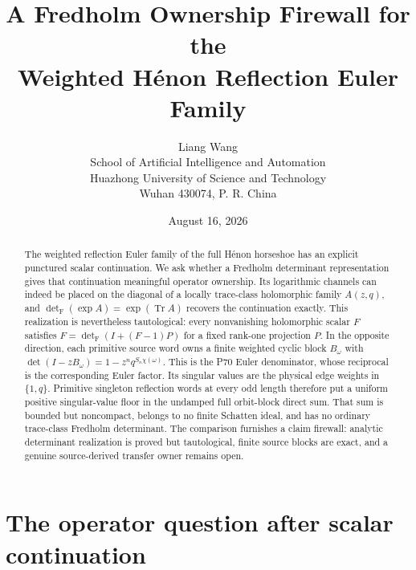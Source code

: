 \documentclass[11pt]{article}
\title{A Fredholm Ownership Firewall for the\\Weighted H\'enon Reflection Euler Family}
\author{Liang Wang\\\small School of Artificial Intelligence and Automation\\\small Huazhong University of Science and Technology\\\small Wuhan 430074, P. R. China}
\date{August 16, 2026}
\newcommand{\Fdet}{\det_{\mathrm F}}
\begin{document}
\maketitle

\begin{abstract}
The weighted reflection Euler family of the full H\'enon horseshoe has an
explicit punctured scalar continuation.  We ask whether a Fredholm
determinant representation gives that continuation meaningful operator
ownership.  Its logarithmic channels can indeed be placed on the diagonal
of a locally trace-class holomorphic family $A(z,q)$, and
$\Fdet(\exp A)=\exp(\operatorname{Tr}A)$ recovers the continuation exactly.
This realization is nevertheless tautological: every nonvanishing
holomorphic scalar $F$ satisfies
$F=\Fdet(I+(F-1)P)$ for a fixed rank-one projection $P$.  In the opposite
direction, each primitive source word owns a finite weighted cyclic block
$B_\omega$ with
$\det(I-zB_\omega)=1-z^nq^{S_n\chi(\omega)}$.  This is the P70 Euler
denominator, whose reciprocal is the corresponding Euler factor.  Its singular values are the
physical edge weights in $\{1,q\}$.  Primitive singleton reflection words at
every odd length therefore put a uniform positive singular-value floor in
the undamped full orbit-block direct sum.  That sum is bounded but
noncompact, belongs to no finite Schatten ideal, and has no ordinary
trace-class Fredholm determinant.  The comparison furnishes a claim
firewall: analytic determinant realization is proved but tautological,
finite source blocks are exact, and a genuine source-derived transfer owner
remains open.
\end{abstract}

\section{The operator question after scalar continuation}
\end{document}
